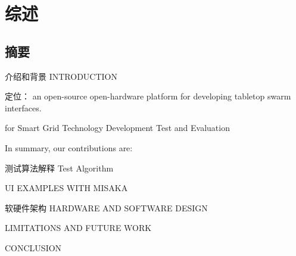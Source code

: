 \chapter{综述}
\label{cha:Overview}

\section{摘要}

介绍和背景 INTRODUCTION

定位： an open-source open-hardware platform for developing tabletop swarm interfaces.

for Smart Grid Technology Development Test and Evaluation

In summary, our contributions are:


测试算法解释 Test Algorithm

UI EXAMPLES WITH MISAKA

软硬件架构 HARDWARE AND SOFTWARE DESIGN

LIMITATIONS AND FUTURE WORK

CONCLUSION